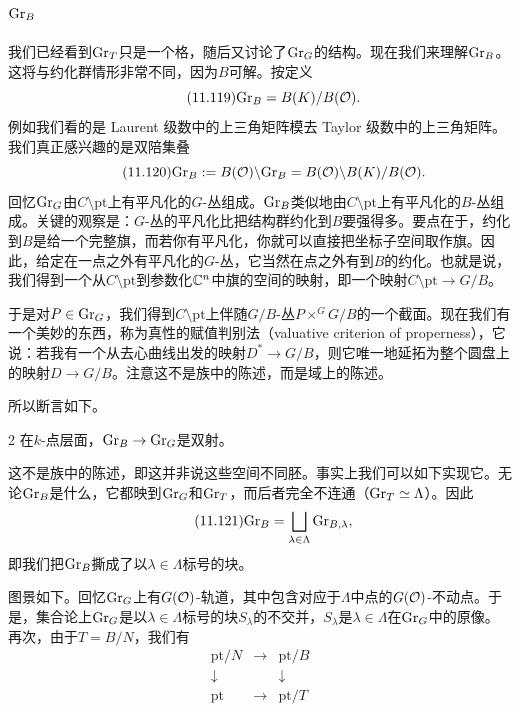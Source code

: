 \subsection{$\mathrm{Gr}_B$}\label{sec:11-6-3}

我们已经看到$\mathrm{Gr}_T$只是一个格，随后又讨论了$\mathrm{Gr}_G$的结构。现在我们来理解$\mathrm{Gr}_B$。这将与约化群情形非常不同，因为$B$可解。按定义
\begin{equation}\tag{11.119}
\mathrm{Gr}_B=B(K)/B(\mathcal{O}).
\end{equation}
例如我们看的是 Laurent 级数中的上三角矩阵模去 Taylor 级数中的上三角矩阵。我们真正感兴趣的是双陪集叠
\begin{equation}\tag{11.120}
\mathrm{Gr}_B:=B(\mathcal{O})\backslash\mathrm{Gr}_B=B(\mathcal{O})\backslash B(K)/B(\mathcal{O}).
\end{equation}
回忆$\mathrm{Gr}_G$由$C\setminus\mathrm{pt}$上有平凡化的$G$-丛组成。$\mathrm{Gr}_B$类似地由$C\setminus\mathrm{pt}$上有平凡化的$B$-丛组成。关键的观察是：$G$-丛的平凡化比把结构群约化到$B$要强得多。要点在于，约化到$B$是给一个完整旗，而若你有平凡化，你就可以直接把坐标子空间取作旗。因此，给定在一点之外有平凡化的$G$-丛，它当然在点之外有到$B$的约化。也就是说，我们得到一个从$C\setminus\mathrm{pt}$到参数化$\mathbb{C}^{n}$中旗的空间的映射，即一个映射$C\setminus\mathrm{pt}\to G/B$。

于是对$P\in\mathrm{Gr}_G$，我们得到$C\setminus\mathrm{pt}$上伴随$G/B$-丛$P\times^{G}G/B$的一个截面。现在我们有一个美妙的东西，称为真性的赋值判别法（valuative criterion of properness），它说：若我有一个从去心曲线出发的映射$D^{*}\to G/B$，则它唯一地延拓为整个圆盘上的映射$D\to G/B$。注意这不是族中的陈述，而是域上的陈述。

所以断言如下。

\begin{srcclaim}{2}
在$k$-点层面，$\mathrm{Gr}_B\to\mathrm{Gr}_G$是双射。
\end{srcclaim}

这不是族中的陈述，即这并非说这些空间不同胚。事实上我们可以如下实现它。无论$\mathrm{Gr}_B$是什么，它都映到$\mathrm{Gr}_G$和$\mathrm{Gr}_T$，而后者完全不连通（$\mathrm{Gr}_T\simeq\Lambda$）。因此
\begin{equation}\tag{11.121}
\mathrm{Gr}_B=\bigsqcup_{\lambda\in\Lambda}\mathrm{Gr}_{B,\lambda},
\end{equation}
即我们把$\mathrm{Gr}_B$撕成了以$\lambda\in\Lambda$标号的块。

图景如下。回忆$\mathrm{Gr}_G$上有$G(\mathcal{O})$-轨道，其中包含对应于$\Lambda$中点的$G(\mathcal{O})$-不动点。于是，集合论上$\mathrm{Gr}_G$是以$\lambda\in\Lambda$标号的块$S_\lambda$的不交并，$S_\lambda$是$\lambda\in\Lambda$在$\mathrm{Gr}_G$中的原像。再次，由于$T=B/N$，我们有
\begin{equation}\tag{11.122}
\begin{array}{ccc}
\mathrm{pt}/N & \longrightarrow & \mathrm{pt}/B\\
\downarrow & & \downarrow\\
\mathrm{pt} & \longrightarrow & \mathrm{pt}/T
\end{array}
\end{equation}

